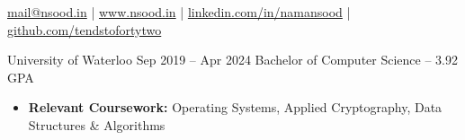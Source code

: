 \documentclass{article}
\begin{document}
    
\vspace{1mm}
{
  \hfill
  \href{mailto:mail@nsood.in}{mail@nsood.in} | 
  \href{https://www.nsood.in}{www.nsood.in} | 
  \href{https://linkedin.com/in/namansood}{linkedin.com/in/namansood} |
  \href{https://github.com/tendstofortytwo}{github.com/tendstofortytwo}
  \hfill
}

\EducationEntry
  {University of Waterloo}
  {Sep 2019 -- Apr 2024}
  {Bachelor of Computer Science -- 3.92 GPA}
  {
    \begin{itemize} \itemsep -1pt
      \item \textbf{Relevant Coursework:} Operating Systems, Applied Cryptography, Data Structures \& Algorithms
    \end{itemize}
  }

\vspace{1mm} %
\end{document}
